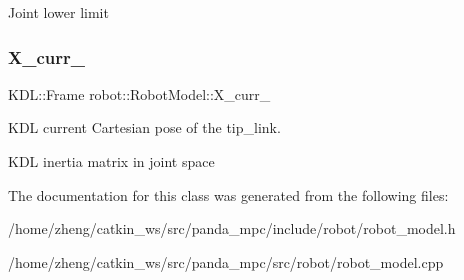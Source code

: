 Joint lower limit \mbox{\label{classrobot_1_1_robot_model_a94479ee0713f64be16b8a92c8bb8a044}} 
\subsubsection{\texorpdfstring{X\+\_\+curr\+\_\+}{X\_curr\_}}
{\footnotesize\ttfamily K\+D\+L\+::\+Frame robot\+::\+Robot\+Model\+::\+X\+\_\+curr\+\_\+\hspace{0.3cm}{\ttfamily [protected]}}



K\+DL current Cartesian pose of the tip\+\_\+link. 

K\+DL inertia matrix in joint space 

The documentation for this class was generated from the following files\+:\begin{DoxyCompactItemize}
\item 
/home/zheng/catkin\+\_\+ws/src/panda\+\_\+mpc/include/robot/robot\+\_\+model.\+h\item 
/home/zheng/catkin\+\_\+ws/src/panda\+\_\+mpc/src/robot/robot\+\_\+model.\+cpp\end{DoxyCompactItemize}
